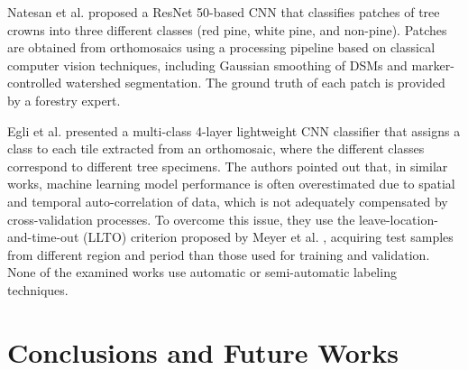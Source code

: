 \documentclass[comsoc,final]{IEEEtran}
\begin{document}
Natesan et al. \cite{Natesan2019475} proposed a ResNet 50-based CNN that classifies patches of tree crowns into three different classes (red pine, white pine, and non-pine). Patches are obtained from orthomosaics using a processing pipeline based on classical computer vision techniques, including Gaussian smoothing of DSMs and marker-controlled watershed segmentation. The ground truth of each patch is provided by a forestry expert.

Egli et al. \cite{Egli20201} presented a multi-class 4-layer lightweight CNN classifier that assigns a class to each tile extracted from an orthomosaic, where the different classes correspond to different tree specimens. The authors pointed out that, in similar works, machine learning model performance is often overestimated due to spatial and temporal auto-correlation of data, which is not adequately compensated by cross-validation processes. To overcome this issue, they use the leave-location-and-time-out (LLTO) criterion proposed by Meyer et al. \cite{Meyer2008}, acquiring test samples from different region and period than those used for training and validation.
None of the examined works use automatic or semi-automatic labeling techniques.

\section{Conclusions and Future Works}\label{sec:conclusion}
\end{document}
